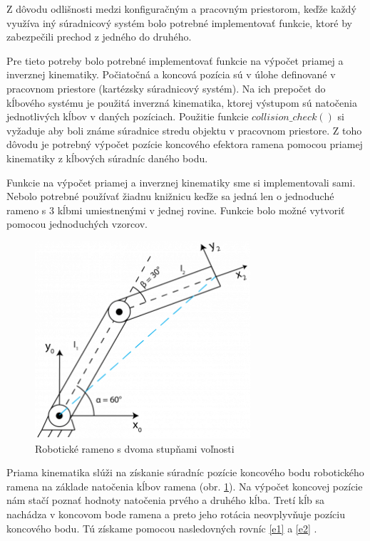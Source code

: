 Z dôvodu odlišnosti medzi konfiguračným a pracovným priestorom, keďže každý využíva iný súradnicový systém bolo potrebné implementovať funkcie, ktoré by zabezpečili prechod z jedného do druhého.   

Pre tieto potreby bolo potrebné implementovať funkcie na výpočet priamej a inverznej kinematiky.
Počiatočná a koncová pozícia sú v úlohe definované v pracovnom priestore (kartézsky súradnicový systém). Na ich prepočet do kĺbového systému je použitá inverzná kinematika, ktorej výstupom sú natočenia jednotlivých kĺbov v daných pozíciach. Použitie funkcie  $ collision\_check() $ si vyžaduje aby boli známe súradnice stredu objektu v pracovnom priestore. Z toho dôvodu je potrebný výpočet pozície koncového efektora ramena pomocou priamej kinematiky z kĺbových súradníc daného bodu.

Funkcie na výpočet priamej a inverznej kinematiky sme si implementovali sami. Nebolo potrebné používať žiadnu knižnicu keďže sa jedná len o jednoduché rameno s 3 kĺbmi umiestnenými v jednej rovine. Funkcie bolo možné vytvoriť pomocou jednoduchých vzorcov.

 \begin{figure}[h]
	\centering
	\includegraphics[width=80mm]{img/FK1.png}
	\caption{Robotické rameno s dvoma stupňami voľnosti \cite{FK}} \label{OBRAZOK 4.8} 
\end{figure} 

Priama kinematika slúži na získanie súradníc pozície koncového bodu robotického ramena na základe natočenia kĺbov ramena (obr. \ref{OBRAZOK 4.8}). Na výpočet koncovej pozície nám stačí poznať hodnoty natočenia prvého a druhého kĺba. Tretí kĺb sa nachádza v koncovom bode ramena a preto jeho rotácia neovplyvňuje pozíciu koncového bodu.
Tú získame pomocou nasledovných rovníc  \ref{e1}  a  \ref{e2}  \cite{FK}.


